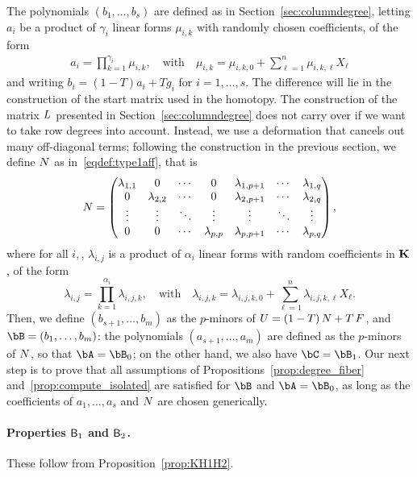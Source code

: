 \documentclass[12pt]{article}
\begin{document}
The polynomials $(b_1,\dots,b_s)$ are defined as in Section~\ref{sec:columndegree}, letting $a_i$ be a product of $\gamma_i$ linear forms
$\mu_{i,k}$ with randomly chosen coefficients, of the form
\begin{align}\label{eqdef:ai}
a_i=\prod_{k=1}^{\gamma_i} \mu_{i,k},\quad\text{with}\quad
\mu_{i,k}=\mu_{i,k,0} + \sum_{\ell=1}^n \mu_{i,k,\ell}X_\ell
\end{align}
and writing $b_i=(1-T)a_i + T g_i$ for $i=1,\dots,s$. The difference
will lie in the construction of the start matrix used in the homotopy. The
construction of the matrix ${L}$ presented in
Section~\ref{sec:columndegree} does not carry over if we want to take
row degrees into account. Instead, we use a deformation that cancels
out many off-diagonal terms; following the construction in the
previous section, we define ${N}$ as in~\eqref{eqdef:type1aff}, that is
\begin{align*}
{N} = \left( \begin{matrix}
\lambda_{1,1} & 0 & \cdots & 0 & \lambda_{1,p+1} & \cdots & \lambda_{1, q}\\
0 & \lambda_{2,2} & \cdots & 0 & \lambda_{2,p+1} & \cdots & \lambda_{2, q}\\
\vdots & \vdots & \ddots & \vdots & \vdots & \ddots & \vdots\\
0 & 0 & \cdots & \lambda_{p,p} & \lambda_{p,p+1} & \cdots & \lambda_{p, q}
\end{matrix} \right), 
\end{align*} 
where for all $i,$, $\lambda_{i,j}$ is a product of $\alpha_i$ linear forms with random
coefficients in $\mathbf{K}$, of the form
$$\lambda_{i,j}= \prod_{k=1}^{\alpha_i}\lambda_{i,j,k},
\quad\text{with}\quad
\lambda_{i,j,k} =\lambda_{i,j,k,0} + \sum_{\ell=1}^n \lambda_{i,j,k,\ell}X_\ell.
$$ Then, we define $(b_{s+1},\dots,b_m)$ as the
$p$-minors of ${U}=(1-T)\,{N} + T\, {F}$, and $\bB=(b_1,\dots,b_m)$:
the polynomials $(a_{s+1},\dots,a_m)$ are defined as the $p$-minors of
${N}$, so that $\bA=\bB_0$; on the other hand, we also have
$\bC=\bB_1$.  Our next step is to prove that all assumptions of
Propositions~\ref{prop:degree_fiber} and~\ref{prop:compute_isolated}
are satisfied for $\bB$ and $\bA=\bB_0$, as long as the coefficients 
of $a_1,\dots,a_s$ and ${N}$ are chosen generically.

\paragraph{Properties $\mathsf{B}_1$ and $\mathsf{B}_2$.}
These follow from Proposition~\ref{prop:KH1H2}.
\end{document}

